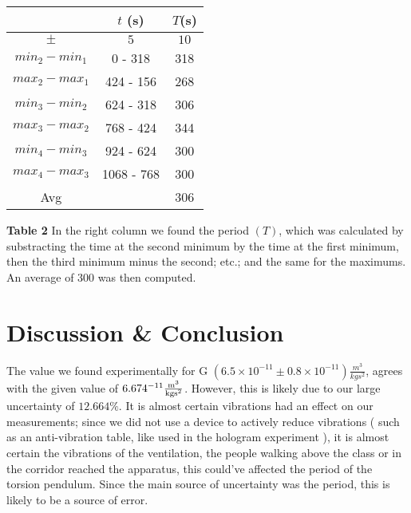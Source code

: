 \documentclass[12pt]{article}
\begin{document}
\begin{center}
    \begin{threeparttable}\label{tab:period}

        \begin{tabular}{|c|c|c|}
            \hline
     & $t$ (s) & $T$(s)\\ \hline 
            $\pm$ & $5$ & $10$ \\ \hline
            $min_2 - min_1$ &0 - 318 & 318 \\ \hline 
            $max_2 - max_1$ &424 - 156 & 268 \\ \hline
            $min_3 - min_2$ &624 - 318 & 306 \\ \hline
            $max_3 - max_2$ &768 - 424 & 344 \\ \hline
            $min_4 - min_3$ &924 - 624 & 300 \\ \hline
            $max_4 - max_3$ &1068 - 768 & 300 \\ \hline
            Avg& & 306 \\ \hline
        \end{tabular}
        \begin{tablenotes}
        \item \footnotesize \textbf{Table 2} In the right column we found the period $(T)$, which was calculated by substracting the time at the second minimum by the time at the first minimum, then the third minimum minus the second; etc.; and the same for the maximums. An average of 300 was then computed. 
        \end{tablenotes}
    \end{threeparttable}
\end{center}






\newpage
\section*{Discussion \& Conclusion}

The value we found experimentally for G $(6.5 \times 10^{-11}\pm 0.8 \times 10^{-11})\frac{\si{m^3}}{\si{kgs^2}}$, agrees with the given value of $6.674 \time 10^{-11}\frac{\si{m^3}}{\si{kgs^2}}$. However, this is likely due to our large uncertainty of $12.664 \%$. It is almost certain vibrations had an effect on our measurements; since we did not use a device to actively reduce vibrations ( such as an anti-vibration table, like used in the hologram experiment ), it is almost certain the vibrations of the ventilation, the people walking above the class or in the corridor reached the apparatus, this could've affected the period of the torsion pendulum. Since the main source of uncertainty was the period, this is likely to be a source of error.
\end{document}
